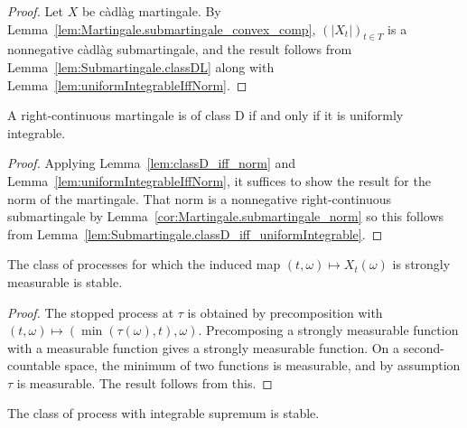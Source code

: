 \begin{proof}\leanok
Let $X$ be càdlàg martingale. By Lemma~\ref{lem:Martingale.submartingale_convex_comp}, $(|X_t|)_{t \in T}$ is a nonnegative càdlàg submartingale, and the result follows from Lemma~\ref{lem:Submartingale.classDL} along with Lemma~\ref{lem:uniformIntegrableIffNorm}.
\end{proof}


\begin{lemma}\label{lem:Martingale.classD_iff_uniformIntegrable}
  \leanok
A right-continuous martingale is of class D if and only if it is uniformly integrable.
\end{lemma}

\begin{proof}\leanok
Applying Lemma~\ref{lem:classD_iff_norm} and Lemma~\ref{lem:uniformIntegrableIffNorm}, it suffices to show the result for the norm of the martingale.
That norm is a nonnegative right-continuous submartingale by Lemma~\ref{cor:Martingale.submartingale_norm} so this follows from Lemma~\ref{lem:Submartingale.classD_iff_uniformIntegrable}.
\end{proof}


\begin{lemma}\label{lem:isStable_stronglyMeasurable_uncurry}
  \leanok
The class of processes for which the induced map $(t,\omega)\mapsto X_t(\omega)$ is strongly measurable is stable.
\end{lemma}

\begin{proof}
The stopped process at $\tau$ is obtained by precomposition with $(t, \omega) \mapsto (\min (\tau(\omega), t), \omega)$.
Precomposing a strongly measurable function with a measurable function gives a strongly measurable function.
On a second-countable space, the minimum of two functions is measurable, and by assumption $\tau$ is measurable.
The result follows from this.
\end{proof}


\begin{lemma}\label{lem:isStable_hasIntegrableSup}
  \leanok
The class of process with integrable supremum is stable.
\end{lemma}

